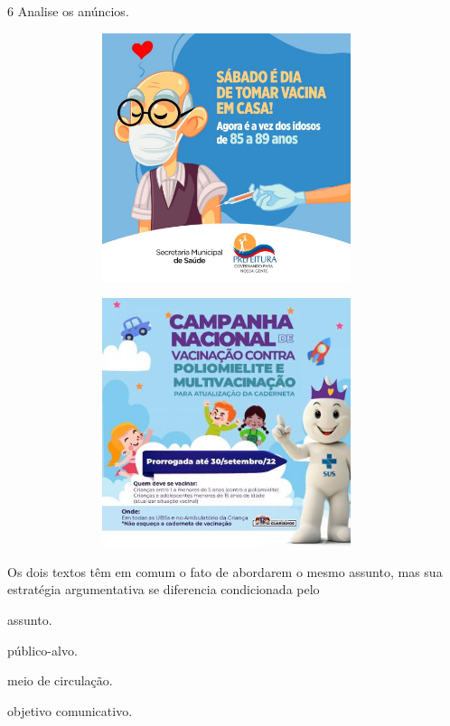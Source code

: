 \num{6} Analise os anúncios.

\begin{figure}[H]
\centering
\includegraphics[width=4.21103in,height=2.86458in]{./imgSAEB_8_POR/media/image29.png}
\end{figure}

\begin{figure}[H]
\centering
\includegraphics[width=4.21103in,height=2.86458in]{./imgSAEB_8_POR/media/image30.png}
\end{figure}

Os dois textos têm em comum o fato de abordarem o mesmo assunto, mas sua
estratégia argumentativa se diferencia condicionada pelo

\begin{escolha}
\item assunto.

\item público-alvo.

\item meio de circulação.

\item objetivo comunicativo.
\end{escolha}


